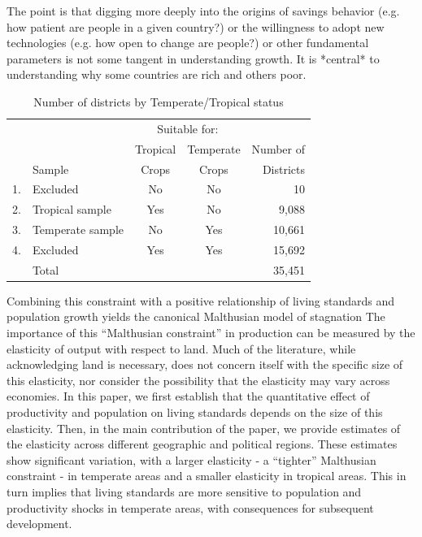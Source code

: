 The point is that digging more deeply into the origins of savings behavior (e.g. how patient are people in a given country?) or the willingness to adopt new technologies (e.g. how open to change are people?) or other fundamental parameters is not some tangent in understanding growth. It is *central* to understanding why some countries are rich and others poor. 




\begin{table}[!htb]
\begin{center}
\caption{Number of districts by Temperate/Tropical status}
\label{TAB_breakdown}
{\small
\begin{tabular}{llccr}
\midrule
& & \multicolumn{2}{c}{Suitable for:} & \\ \cmidrule(lr){3-4}
& & Tropical & Temperate & Number of\\
& Sample & Crops    & Crops     & Districts \\ \midrule
1. & Excluded & No & No & 10 \\
2. & Tropical sample & Yes & No & 9,088 \\
3. & Temperate sample & No  & Yes & 10,661 \\
4. & Excluded & Yes & Yes & 15,692 \\ \midrule
   & Total    &     &     & 35,451 \\
\midrule
\end{tabular}
}
\end{center}
\vspace{-.5cm}
\end{table}


Combining this constraint with a positive relationship of living standards and population growth yields the canonical Malthusian model of stagnation  The importance of this ``Malthusian constraint'' in production can be measured by the elasticity of output with respect to land. Much of the literature, while acknowledging land is necessary, does not concern itself with the specific size of this elasticity, nor consider the possibility that the elasticity may vary across economies. In this paper, we first establish that the quantitative effect of productivity and population on living standards depends on the size of this elasticity. Then, in the main contribution of the paper, we provide estimates of the elasticity across different geographic and political regions. These estimates show significant variation, with a larger elasticity - a ``tighter'' Malthusian constraint - in temperate areas and a smaller elasticity in tropical areas. This in turn implies that living standards are more sensitive to population and productivity shocks in temperate areas, with consequences for subsequent development. 

